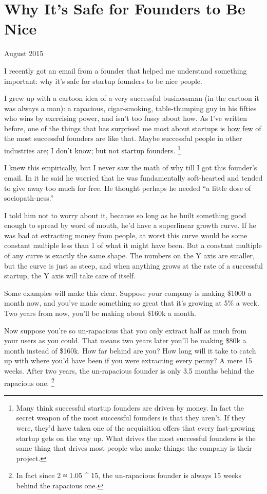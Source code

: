 \chapter{Why It's Safe for Founders to Be Nice}

August 2015

I recently got an email from a founder that helped me understand
something important: why it's safe for startup founders to be nice
people.

I grew up with a cartoon idea of a very successful businessman (in the
cartoon it was always a man): a rapacious, cigar-smoking, table-thumping
guy in his fifties who wins by exercising power, and isn't too fussy
about how. As I've written before, one of the things that has surprised
me most about startups is \href{mean.html}{how few} of the most
successful founders are like that. Maybe successful people in other
industries are; I don't know; but not startup founders.
\footnote{Many think successful startup founders are driven by money. In
fact the secret weapon of the most successful founders is that they
aren't. If they were, they'd have taken one of the acquisition offers
that every fast-growing startup gets on the way up. What drives the most
successful founders is the same thing that drives most people who make
things: the company is their project.}

I knew this empirically, but I never saw the math of why till I got this
founder's email. In it he said he worried that he was fundamentally
soft-hearted and tended to give away too much for free. He thought
perhaps he needed ``a little dose of sociopath-ness.''

I told him not to worry about it, because so long as he built something
good enough to spread by word of mouth, he'd have a superlinear growth
curve. If he was bad at extracting money from people, at worst this
curve would be some constant multiple less than 1 of what it might have
been. But a constant multiple of any curve is exactly the same shape.
The numbers on the Y axis are smaller, but the curve is just as steep,
and when anything grows at the rate of a successful startup, the Y axis
will take care of itself.

Some examples will make this clear. Suppose your company is making
\$1000 a month now, and you've made something so great that it's growing
at 5\% a week. Two years from now, you'll be making about \$160k a
month.

Now suppose you're so un-rapacious that you only extract half as much
from your users as you could. That means two years later you'll be
making \$80k a month instead of \$160k. How far behind are you? How long
will it take to catch up with where you'd have been if you were
extracting every penny? A mere 15 weeks. After two years, the
un-rapacious founder is only 3.5 months behind the rapacious one.
\footnote{In fact since 2 ≈ 1.05 \^{} 15, the un-rapacious founder is
always 15 weeks behind the rapacious one.}


